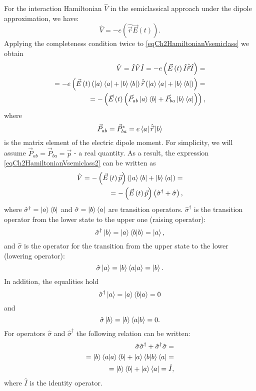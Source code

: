 For the interaction Hamiltonian $\hat{V}$ in the semiclassical
approach under the dipole approximation, we have:
\begin{equation}
\hat{V} = - e \left(\hat{\vec{r}} \vec{E}\left(t\right)\right).
\label{eqCh2HamiltonianVsemiclass}
\end{equation}
Applying the completeness condition twice to \eqref{eqCh2HamiltonianVsemiclass} we obtain
\begin{eqnarray}
\hat{V} = \hat{I}\hat{V}\hat{I} = - e \left(\vec{E}\left(t\right)
\hat{I}\hat{\vec{r}}\hat{I}\right) = 
\nonumber \\
= - e \left(\vec{E}\left(t\right) 
\left(\ket{a}\bra{a} +
  \ket{b}\bra{b}\right)\hat{\vec{r}}
\left(\ket{a}\bra{a} +
  \ket{b}\bra{b}\right)\right) = 
\nonumber \\
= - \left(\vec{E}\left(t\right)
  \left(\vec{P}_{ab}\ket{a}\bra{b} +
    \vec{P}_{ba}\ket{b}\bra{a}\right)\right),
\label{eqCh2HamiltonianVsemiclass2}
\end{eqnarray}
where 
\[
\vec{P}_{ab} = \vec{P}_{ba}^{*} = e \bra{a}\hat{\vec{r}}\ket{b}
\]
is the matrix element of the electric dipole moment. 
For simplicity, we will assume $\vec{P}_{ab} = \vec{P}_{ba} =
\vec{p}$ - a real quantity. As a result, the expression
\eqref{eqCh2HamiltonianVsemiclass2} can be written as
\begin{eqnarray}
\hat{V} 
= - \left(\vec{E}\left(t\right)\vec{p}\right)
\left(
  \ket{a}\bra{b} +
  \ket{b}\bra{a}\right) = 
\nonumber \\
= - \left(\vec{E}\left(t\right)\vec{p}\right) \left(\hat{\sigma}^{\dag} + \hat{\sigma}\right),
\label{eqCh2HamiltonianVsemiclass3}
\end{eqnarray}
where  $\hat{\sigma}^{\dag} = \ket{a}\bra{b}$ and 
$\hat{\sigma} = \ket{b}\bra{a}$ 
are transition operators. 
$\hat{\sigma}^{\dag}$ is the transition operator from the lower state to the upper one (raising
operator):
\[
\hat{\sigma}^{\dag} \ket{b} = 
\ket{a}\bra{b}\ket{b} = 
\ket{a},
\]
and $\hat{\sigma}$
is the operator for the transition from the upper state to the lower
(lowering operator):
\[
\hat{\sigma}
\ket{a} = 
\ket{b}\bra{a}\ket{a} = 
\ket{b}.
\]
In addition, the equalities hold
\[
\hat{\sigma}^{\dag} \ket{a} = 
\ket{a}\bra{b}\ket{a} = 
0
\]
and
\[
\hat{\sigma}
\ket{b} = 
\ket{b}\bra{a}\ket{b} = 
0.
\]
For operators $\hat{\sigma}$ and $\hat{\sigma}^{\dag}$ the following relation can be written: 
\begin{eqnarray}
\hat{\sigma}\hat{\sigma}^{\dag} + \hat{\sigma}^{\dag}\hat{\sigma} =
\nonumber \\
= \ket{b}\bra{a}\ket{a}\bra{b} + 
 \ket{a}\bra{b}\ket{b}\bra{a} = 
\nonumber \\
= \ket{b}\bra{b} + \ket{a}\bra{a} = \hat{I}, 
\label{eqCh2_task1}
\end{eqnarray}
where $\hat{I}$ is the identity operator.

